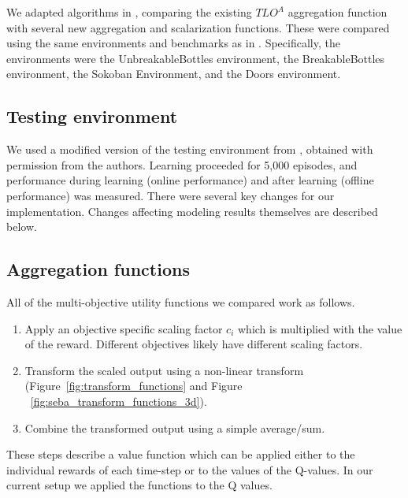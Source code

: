 We adapted algorithms in \cite{vamplew_potential-based_2021}, comparing the existing $TLO^A$ aggregation function with several new aggregation and scalarization functions. These were compared using the same environments and benchmarks as in \cite{vamplew_potential-based_2021}. Specifically, the environments were the UnbreakableBottles environment, the BreakableBottles environment, the Sokoban Environment, and the Doors environment.
\subsection{Testing environment}

We used a modified version of the testing environment from \cite{vamplew_potential-based_2021}, obtained with permission from the authors. Learning proceeded for 5,000 episodes, and performance during learning (online performance) and after learning (offline performance) was measured. There were several key changes for our implementation. Changes affecting modeling results themselves are described below.



\subsection{Aggregation functions}



All of the multi-objective utility functions we compared work as follows. 
\begin{enumerate}

    \item Apply an objective specific scaling factor $c_i$ which is multiplied with the value of the reward. Different objectives likely have different scaling factors.  
    \item Transform the scaled output using a non-linear transform (Figure~\ref{fig:transform_functions} and Figure ~\ref{fig:seba_transform_functions_3d}). %
    
    \item Combine the transformed output using a simple average/sum.
\end{enumerate}

These steps describe a value function which can be applied either to the individual rewards of each time-step or to the values of the Q-values. In our current setup we applied the functions to the Q values.

